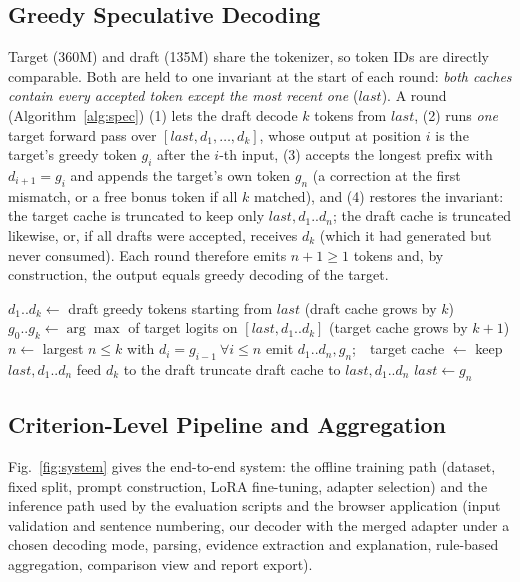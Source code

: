 \subsection{Greedy Speculative Decoding}
\label{sec:spec}
Target (360M) and draft (135M) share the tokenizer, so token IDs are directly comparable. Both are held to one invariant at the start of each round: \emph{both caches contain every accepted token except the most recent one} ($\mathit{last}$). A round (Algorithm~\ref{alg:spec}) (1) lets the draft decode $k$ tokens from $\mathit{last}$, (2) runs \emph{one} target forward pass over $[\mathit{last},d_1,\dots,d_k]$, whose output at position $i$ is the target's greedy token $g_i$ after the $i$-th input, (3) accepts the longest prefix with $d_{i+1}=g_i$ and appends the target's own token $g_n$ (a correction at the first mismatch, or a free bonus token if all $k$ matched), and (4) restores the invariant: the target cache is truncated to keep only $\mathit{last},d_1..d_n$; the draft cache is truncated likewise, or, if all drafts were accepted, receives $d_k$ (which it had generated but never consumed). Each round therefore emits $n+1\ge1$ tokens and, by construction, the output equals greedy decoding of the target.

\begin{algorithm}[t]\caption{One round of greedy speculative decoding}\label{alg:spec}
\begin{algorithmic}[1]
\small
\State $d_1..d_k\gets$ draft greedy tokens starting from $\mathit{last}$ (draft cache grows by $k$)
\State $g_0..g_k\gets\arg\max$ of target logits on $[\mathit{last},d_1..d_k]$ (target cache grows by $k{+}1$)
\State $n\gets$ largest $n\le k$ with $d_i=g_{i-1}\ \forall i\le n$
\State emit $d_1..d_n,g_n$;\ \ target cache $\gets$ keep $\mathit{last},d_1..d_n$
 feed $d_k$ to the draft \Else{} truncate draft cache to $\mathit{last},d_1..d_n$ \EndIf
\State $\mathit{last}\gets g_n$
\end{algorithmic}
\end{algorithm}

\subsection{Criterion-Level Pipeline and Aggregation}
Fig.~\ref{fig:system} gives the end-to-end system: the offline training path (dataset, fixed split, prompt construction, LoRA fine-tuning, adapter selection) and the inference path used by the evaluation scripts and the browser application (input validation and sentence numbering, our decoder with the merged adapter under a chosen decoding mode, parsing, evidence extraction and explanation, rule-based aggregation, comparison view and report export).

